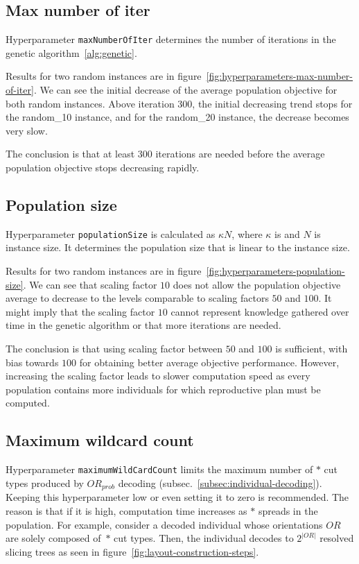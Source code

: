 \newpage
\subsection{Max number of iter}\label{subsec:max-number-of-iter}
Hyperparameter \verb|maxNumberOfIter| determines the number of iterations in the genetic algorithm~\ref{alg:genetic}.

Results for two random instances are in figure~\ref{fig:hyperparameters-max-number-of-iter}.
We can see the initial decrease of the average population objective for both random instances.
Above iteration 300, the initial decreasing trend stops for the random\_10 instance, and for the random\_20 instance, the decrease becomes very slow.

The conclusion is that at least 300 iterations are needed before the average population objective
stops decreasing rapidly.

\subsection{Population size}\label{subsec:population-size}

Hyperparameter \verb|populationSize| is calculated as $\kappa N$, where $\kappa$ is 
and $N$ is instance size.
It determines the population size that is linear to the instance size.

Results for two random instances are in figure~\ref{fig:hyperparameters-population-size}.
We can see that scaling factor $10$ does not allow
the population objective average to decrease to the levels comparable to scaling factors $50$ and $100$.
It might imply that the scaling factor $10$ cannot represent knowledge gathered over time
in the genetic algorithm or that more iterations are needed.

The conclusion is that using scaling factor between $50$ and $100$ is sufficient, with bias towards $100$
for obtaining better average objective performance.
However, increasing the scaling factor leads to slower computation speed as every population contains
more individuals for which reproductive plan must be computed.

\subsection{Maximum wildcard count}\label{subsec:maximum-wild-card-count}
Hyperparameter \verb|maximumWildCardCount| limits the maximum number of $*$ cut types produced by $OR_{prob}$ decoding (subsec.~\ref{subsec:individual-decoding}).
Keeping this hyperparameter low or even setting it to zero is recommended.
The reason is that if it is high, computation time increases as $*$ spreads in the population.
For example, consider a decoded individual whose orientations $OR$ are solely composed of~$*$ cut types.
Then, the  individual decodes to $2^{|OR|}$ resolved slicing trees as seen in figure~\ref{fig:layout-construction-steps}.

